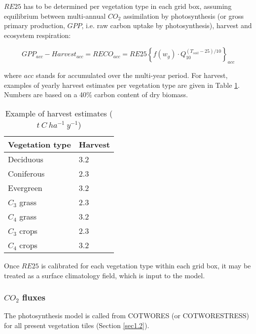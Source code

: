 {$RE25$ has to be determined per vegetation type in
each grid box, assuming equilibrium between multi-annual $CO_{2}$ assimilation by photosynthesis (or
gross primary production, $GPP$, i.e. raw carbon uptake by photosynthesis), harvest and ecosystem
respiration:

\begin{equation}
GPP_{acc} - Harvest_{acc}=RECO_{acc}=RE25 \left \{ f(w_g) \cdot Q_{10}^{(T_{soil}-25)/10} \right \}_{acc}
\end{equation}


where $acc$ stands for accumulated over the multi-year period. For harvest, examples of yearly harvest
estimates per vegetation type are given in Table \ref{tab17}. Numbers are based on a 40\% carbon content of
dry biomass.
\begin{table}
\caption{Example of harvest estimates ($t ~C ~ha^{-1} ~y^{-1}$) \label{harvest}}

			\begin{center}
			\begin{tabular}{ll}\label{tab17} \\
\hline
	Vegetation type		 & Harvest       \\
\hline
Deciduous  & 3.2     \\
Coniferous & 2.3 \\
Evergreen  & 3.2 \\
$C_{3}$ grass   & 2.3 \\
$C_{4}$ grass   & 3.2 \\
$C_{3}$ crops   & 2.3 \\
$C_{4}$ crops   & 3.2 \\
\hline
			\end{tabular}
			\end{center}
\end{table}

Once $RE25$ is calibrated for each vegetation type within each grid box, it may be treated as a surface
climatology field, which is input to the model.


\subsubsection{$CO_{2}$ fluxes}

The photosynthesis model is called from COTWORES (or COTWORESTRESS) for all present
vegetation tiles (Section \ref{sec1.2}). \\

}
